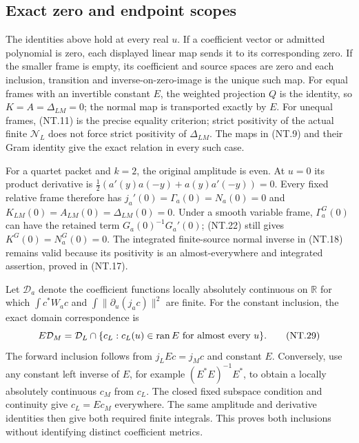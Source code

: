 \subsection{Exact zero and endpoint scopes}

The identities above hold at every real $u$. If a coefficient
vector or admitted polynomial is zero, each displayed linear map
sends it to its corresponding zero. If the smaller frame is empty,
its coefficient and source spaces are zero and each inclusion,
transition and inverse-on-zero-image is the unique such map.
For equal frames with an invertible constant $E$, the weighted
projection $Q$ is the identity, so $K=A=\Delta_{LM}=0$;
the normal map is transported exactly by $E$.
For unequal frames, (NT.11) is the precise equality criterion;
strict positivity of the actual finite $\mathcal N_L$ does not
force strict positivity of $\Delta_{LM}$. The maps in (NT.9)
and their Gram identity give the exact relation in every such case.

For a quartet packet and $k=2$, the original amplitude is even.
At $u=0$ its product derivative is
$\tfrac12(a'(y)a(-y)+a(y)a'(-y))=0$.
Every fixed relative frame therefore has
$j_a'(0)=\Gamma_a(0)=N_a(0)=0$ and
$K_{LM}(0)=A_{LM}(0)=\Delta_{LM}(0)=0$.
Under a smooth variable frame, $\Gamma_a^G(0)$ can have the
retained term $G_a(0)^{-1}G_a'(0)$; (NT.22) still gives
$K^G(0)=N_a^G(0)=0$. The integrated finite-source normal inverse
in (NT.18) remains valid because its positivity is an
almost-everywhere and integrated assertion, proved in (NT.17).

Let $\mathcal D_a$ denote the coefficient functions locally
absolutely continuous on $\mathbb R$ for which
$\int c^*W_ac$ and $\int\|\partial_u(j_ac)\|^2$ are finite.
For the constant inclusion, the exact domain correspondence is
\[
 E\mathcal D_M=\mathcal D_L\cap
 \{c_L:c_L(u)\in\operatorname{ran} E\text{ for almost every }u\}.
 \tag{NT.29}
\]
The forward inclusion follows from $j_LEc=j_Mc$ and constant
$E$. Conversely, use any constant left inverse of $E$, for example
$(E^*E)^{-1}E^*$, to obtain a locally absolutely continuous
$c_M$ from $c_L$. The closed fixed subspace condition and continuity
give $c_L=Ec_M$ everywhere. The same amplitude and derivative
identities then give both required finite integrals. This proves
both inclusions without identifying distinct coefficient metrics.

